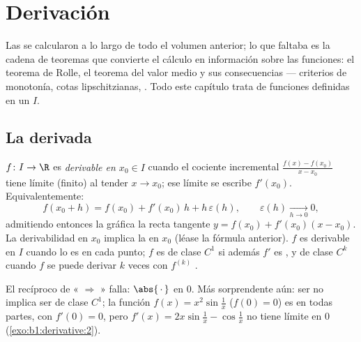 \chapter{Derivación}\label{ch:b1:derivative}

Las  se calcularon a lo largo de todo el volumen anterior;
lo que faltaba es la cadena de teoremas que convierte el cálculo en
información sobre las funciones: el teorema de Rolle, el teorema del
valor medio y sus consecuencias --- criterios de monotonía, cotas
lipschitzianas, . Todo este capítulo trata de funciones
definidas en un  $I$.

\section{La derivada}

\begin{definition}\label{def:b1:derivative:def}
$f \colon I \to \R$ es \emph{derivable en $x_0 \in
I$} cuando el cociente incremental
$\frac{f(x) - f(x_0)}{x - x_0}$ tiene límite (finito) al tender
$x \to x_0$; ese límite se escribe $f'(x_0)$. Equivalentemente:
\[
f(x_0 + h) = f(x_0) + f'(x_0)\,h + h\,\varepsilon(h),
\qquad \varepsilon(h) \xrightarrow[h \to 0]{} 0 ,
\]
admitiendo entonces la gráfica la recta tangente
$y = f(x_0) + f'(x_0)(x - x_0)$. La derivabilidad en $x_0$ implica la
 en $x_0$ (léase la fórmula anterior). $f$ es derivable
en $I$ cuando lo es en cada punto; $f$ es de clase $C^1$ si además
$f'$ es , y de clase
$C^k$ cuando $f$ se puede derivar $k$
veces con $f^{(k)}$ .
\end{definition}

\begin{example}\label{ex:b1:derivative:notc1}
El recíproco de « $\Rightarrow$ » falla:
$\abs{\,\cdot\,}$ en $0$. Más sorprendente aún: ser  no
implica ser de clase $C^1$; la función $f(x) = x^2 \sin\frac 1x$
($f(0) = 0$) es  en todas partes, con $f'(0) = 0$, pero
$f'(x) = 2x \sin\frac1x - \cos\frac 1x$ no tiene límite en $0$
(\cref{exo:b1:derivative:2}).
\end{example}


